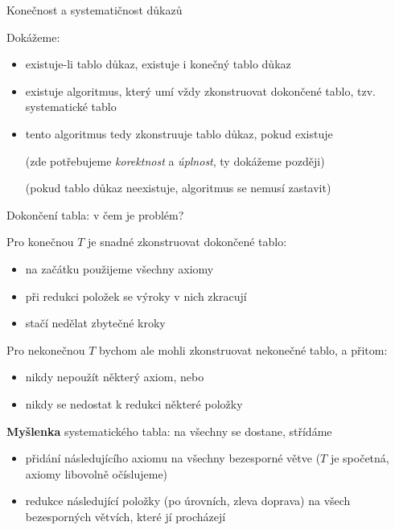 \documentclass{beamer}
\begin{document}
\begin{frame}{Konečnost a systematičnost důkazů}

    Dokážeme:
    \begin{itemize}
        \item existuje-li tablo důkaz, existuje i \alert{konečný} tablo důkaz
        \item existuje algoritmus, který umí vždy zkonstruovat dokončené tablo, tzv. \alert{systematické tablo}
        \item tento algoritmus tedy \alert{zkonstruuje tablo důkaz}, pokud existuje 
        
        \medskip

        (zde potřebujeme \emph{korektnost} a \emph{úplnost}, ty dokážeme později)    
        
        \medskip

        (pokud tablo důkaz neexistuje, algoritmus se nemusí zastavit)
    \end{itemize}
    

\end{frame}


\begin{frame}{Dokončení tabla: v čem je problém?}

    Pro konečnou $T$ je snadné zkonstruovat dokončené tablo:
    \begin{itemize}
        \item na začátku použijeme všechny axiomy
        \item při redukci položek se výroky v nich zkracují
        \item stačí nedělat zbytečné kroky
    \end{itemize}

    Pro \alert{nekonečnou} $T$ bychom ale mohli zkonstruovat nekonečné tablo, a přitom:
    \begin{itemize}
        \item nikdy nepoužít některý axiom, nebo
        \item nikdy se nedostat k redukci některé položky
    \end{itemize}
        
    \textbf{Myšlenka} \alert{systematického tabla}: na všechny se dostane, střídáme
    \begin{itemize}
        \item \alert{přidání následujícího axiomu} na všechny bezesporné větve ($T$ je spočetná, axiomy libovolně očíslujeme)
        \item \alert{redukce následující položky} (po úrovních, zleva doprava) na všech bezesporných větvích, které jí procházejí  
    \end{itemize}

\end{frame}
\end{document}
